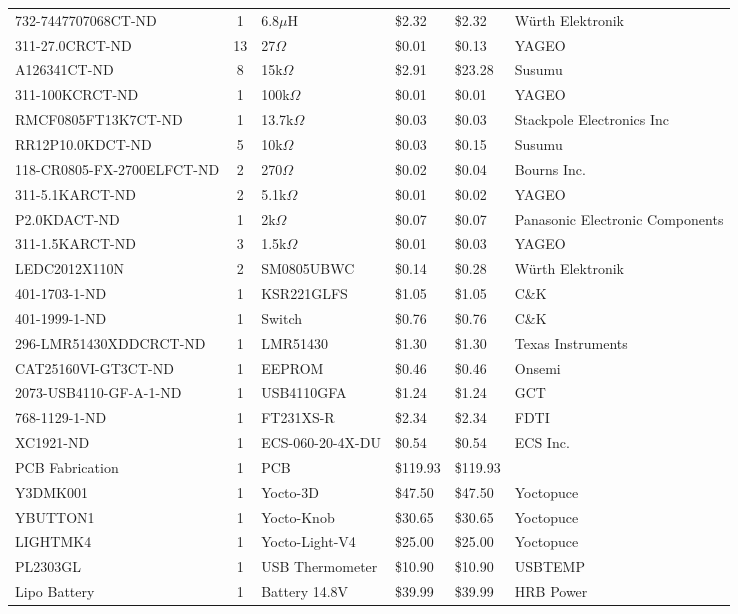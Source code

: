 \documentclass[../main.tex]{subfiles}
\begin{document}
\begin{longtable}{|p{5cm}|c|p{3cm}|p{1.3cm}|p{1.3cm}|p{5cm}|}
732-7447707068CT-ND & 1 & 6.8$\mu$H & \$2.32 & \$2.32 & Würth Elektronik \\
311-27.0CRCT-ND & 13 & 27$\Omega$ & \$0.01 & \$0.13 & YAGEO \\
A126341CT-ND & 8 & 15k$\Omega$ & \$2.91 & \$23.28 & Susumu \\
311-100KCRCT-ND & 1 & 100k$\Omega$ & \$0.01 & \$0.01 & YAGEO \\
RMCF0805FT13K7CT-ND & 1 & 13.7k$\Omega$ & \$0.03 & \$0.03 & Stackpole Electronics Inc \\
RR12P10.0KDCT-ND & 5 & 10k$\Omega$ & \$0.03 & \$0.15 & Susumu \\
118-CR0805-FX-2700ELFCT-ND & 2 & 270$\Omega$ & \$0.02 & \$0.04 & Bourns Inc. \\
311-5.1KARCT-ND & 2 & 5.1k$\Omega$ & \$0.01 & \$0.02 & YAGEO \\
P2.0KDACT-ND & 1 & 2k$\Omega$ & \$0.07 & \$0.07 & Panasonic Electronic Components \\
311-1.5KARCT-ND & 3 & 1.5k$\Omega$ & \$0.01 & \$0.03 & YAGEO \\
LEDC2012X110N & 2 & SM0805UBWC & \$0.14 & \$0.28 & Würth Elektronik \\
401-1703-1-ND & 1 & KSR221GLFS & \$1.05 & \$1.05 & C\&K \\
401-1999-1-ND & 1 & Switch & \$0.76 & \$0.76 & C\&K \\
296-LMR51430XDDCRCT-ND & 1 & LMR51430 & \$1.30 & \$1.30 & Texas Instruments \\
CAT25160VI-GT3CT-ND & 1 & EEPROM & \$0.46 & \$0.46 & Onsemi \\
2073-USB4110-GF-A-1-ND & 1 & USB4110GFA & \$1.24 & \$1.24 & GCT \\
768-1129-1-ND & 1 & FT231XS-R & \$2.34 & \$2.34 & FDTI \\
XC1921-ND & 1 & ECS-060-20-4X-DU & \$0.54 & \$0.54 & ECS Inc. \\
PCB Fabrication & 1 & PCB & \$119.93 & \$119.93 & \\
Y3DMK001 & 1 & Yocto-3D & \$47.50 & \$47.50 & Yoctopuce \\
YBUTTON1 & 1 & Yocto-Knob & \$30.65 & \$30.65 & Yoctopuce \\
LIGHTMK4 & 1 & Yocto-Light-V4 & \$25.00 & \$25.00 & Yoctopuce \\
PL2303GL & 1 & USB Thermometer & \$10.90 & \$10.90 & USBTEMP \\
Lipo Battery & 1 & Battery 14.8V & \$39.99 & \$39.99 & HRB Power \\
\hline
\end{longtable}
\end{document}
